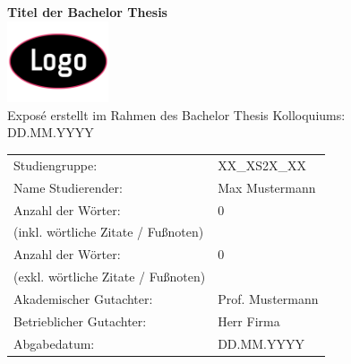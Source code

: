 \documentclass[a4paper,12pt]{scrartcl}
\newcommand{\documentTitle}[1]{{\fontsize{20pt}{24pt}\selectfont\textbf{\color{ba-blau}#1}}}
\begin{document}
\thispagestyle{Deckblatt}

\begin{center}
    \documentTitle {Titel der Bachelor Thesis} \\[3ex]
    \includegraphics[width=3cm]{Platzhalter_logo.png} \\[3ex]
    \large{Exposé erstellt im Rahmen des Bachelor Thesis Kolloquiums:
    } \\
    \large{DD.MM.YYYY}
\end{center}

\renewcommand{\arraystretch}{2.5}
\begin{table}[h]
    \setlength{\tabcolsep}{32pt}
    \begin{tabularx}{\textwidth}{l l}
        Studiengruppe:                      & XX\_XS2X\_XX     \\
        Name Studierender:                  & Max Mustermann   \\
        Anzahl der Wörter:                  & 0                \\ [-15pt]
        (inkl. wörtliche Zitate / Fußnoten) & ~                \\
        Anzahl der Wörter:                  & 0                \\ [-15pt]
        (exkl. wörtliche Zitate / Fußnoten) & ~                \\
        Akademischer Gutachter:             & Prof. Mustermann \\
        Betrieblicher Gutachter:            & Herr Firma       \\
        Abgabedatum:                        & DD.MM.YYYY       \\
    \end{tabularx}
\end{table}

\newpage

\pagestyle{defaultPageStyle}



\setcounter{page}{1}
\end{document}
